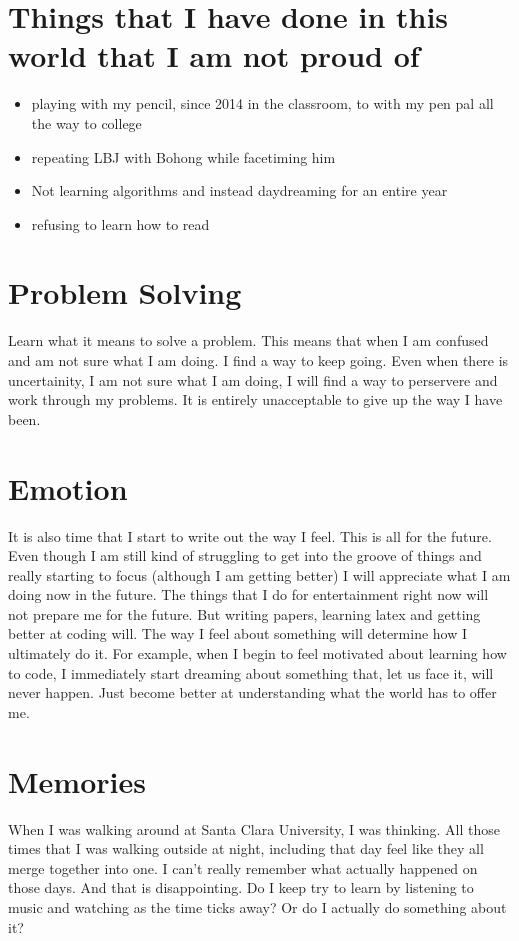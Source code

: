 \documentclass[11pt]{scrartcl}
\begin{document}
\section{Things that I have done in this world that I am not proud of}
\begin{itemize}
    \item playing with my pencil, since 2014 in the classroom, to with my pen pal all the way to college
    \item repeating LBJ with Bohong while facetiming him
    \item Not learning algorithms and instead daydreaming for an entire year
    \item refusing to learn how to read
\end{itemize}
\section{Problem Solving}
Learn what it means to solve a problem. This means that when I am confused and am not sure what I am doing. I find a way to keep going. Even when there is uncertainity, I am not sure what I am doing, I will find a way to perservere and work through my problems. It is entirely unacceptable to give up the way I have been.
\section{Emotion}
It is also time that I start to write out the way I feel. This is all for the future. Even though I am still kind of struggling to get into the groove of things and really starting to focus (although I am getting better) I will appreciate what I am doing now in the future. The things that I do for entertainment right now will not prepare me for the future. But writing papers, learning latex and getting better at coding will. The way I feel about something will determine how I ultimately do it. For example, when I begin to feel motivated about learning how to code, I immediately start dreaming about something that, let us face it, will never happen. Just become better at understanding what the world has to offer me.
\section{Memories}
When I was walking around at Santa Clara University, I was thinking. All those times that I was walking outside at night, including that day feel like they all merge together into one. I can't really remember what actually happened on those days. And that is disappointing. Do I keep try to learn by listening to music and watching as the time ticks away? Or do I actually do something about it?
\end{document}
